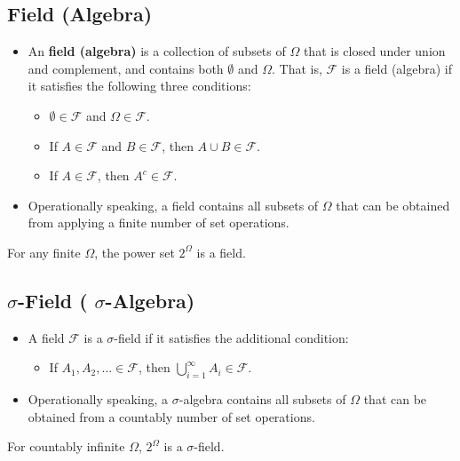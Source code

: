 \subsection{Field (Algebra)}
\begin{itemize}
\item An \textbf{field (algebra)} is a collection of subsets of
  \(\Omega\) that is closed under union and complement, and contains
  both \(\emptyset\) and \(\Omega\). That is, \(\mathcal{F}\) is a
  field (algebra) if it satisfies the following three conditions:
\begin{itemize}
\item \(\emptyset \in \mathcal{F}\) and \(\Omega \in \mathcal{F}\).
\item If \(A \in \mathcal{F}\) and \(B \in \mathcal{F}\), then \(A \cup B \in \mathcal{F}\). 
\item If \(A \in \mathcal{F}\), then \(A^{c} \in \mathcal{F}\).
\end{itemize}
  
\item Operationally speaking, a field contains all subsets of
  \(\Omega\) that can be obtained from applying a finite number of set
  operations.
\end{itemize}

\begin{fact}
 For any finite \(\Omega\), the power set \(2^{\Omega}\) is a field.
\end{fact}

\subsection{\(\sigma\)-Field ( \(\sigma\)-Algebra)}
\begin{itemize}
\item A field \(\mathcal{F}\) is a \(\sigma\)-field if it satisfies the
additional condition:
\begin{itemize}
\item If \(A_{1}, A_{2}, \ldots \in \mathcal{F}\), then \(\bigcup_{i=1}^{\infty} A_{i} \in \mathcal{F}\).
\end{itemize}

\item Operationally speaking, a \(\sigma\)-algebra contains all
  subsets of \(\Omega\) that can be obtained from a countably number
  of set operations.
\end{itemize}
\begin{fact}
For countably infinite \(\Omega\), \(2^{\Omega}\) is a \(\sigma\)-field.
\end{fact}

